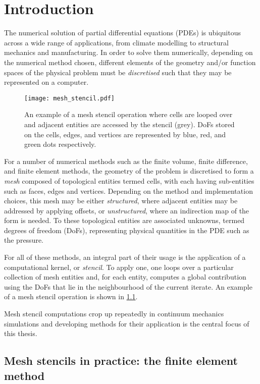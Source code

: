 \documentclass[thesis]{subfiles}
\begin{document}
\chapter{Introduction}
\label{chapter:introduction}

The numerical solution of partial differential equations (PDEs) is ubiquitous across a wide range of applications, from climate modelling to structural mechanics and manufacturing.
In order to solve them numerically, depending on the numerical method chosen, different elements of the geometry and/or function spaces of the physical problem must be \emph{discretised} such that they may be represented on a computer.

\begin{figure}
  \centering
  \texttt{[image: mesh\_stencil.pdf]}
  \caption{
    An example of a mesh stencil operation where cells are looped over and adjacent entities are accessed by the stencil (grey).
    DoFs stored on the cells, edges, and vertices are represented by blue, red, and green dots respectively.
  }
  \label{fig:mesh_stencil}
\end{figure}

For a number of numerical methods such as the finite volume, finite difference, and finite element methods, the geometry of the problem is discretised to form a \emph{mesh} composed of topological entities termed cells, with each having sub-entities such as faces, edges and vertices.
Depending on the method and implementation choices, this mesh may be either \textit{structured}, where adjacent entities may be addressed by applying offsets, or \textit{unstructured}, where an indirection map of the form  is needed.
To these topological entities are associated unknowns, termed degrees of freedom (DoFs), representing physical quantities in the PDE such as the pressure.

For all of these methods, an integral part of their usage is the application of a computational kernel, or \emph{stencil}.
To apply one, one loops over a particular collection of mesh entities and, for each entity, computes a global contribution using the DoFs that lie in the neighbourhood of the current iterate.
An example of a mesh stencil operation is shown in \cref{fig:mesh_stencil}.

Mesh stencil computations crop up repeatedly in continuum mechanics simulations and developing methods for their application is the central focus of this thesis.

\section{Mesh stencils in practice: the finite element method}
\label{sec:stokes_equations}
\end{document}
